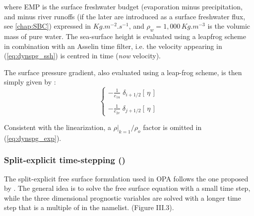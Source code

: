 \documentclass[../tex_main/NEMO_manual]{subfiles}
\begin{document}
where EMP is the surface freshwater budget (evaporation minus precipitation, and minus river runoffs (if the later are introduced as a surface freshwater flux, see \autoref{chap:SBC}) expressed in $Kg.m^{-2}.s^{-1}$, and $\rho _w =1,000\,Kg.m^{-3}$ is the volumic mass of pure water. The sea-surface height is evaluated using a leapfrog scheme in combination with an Asselin time filter, i.e. the velocity appearing in (\autoref{eq:dynspg_ssh}) is centred in time (\textit{now} velocity). 

The surface pressure gradient, also evaluated using a leap-frog scheme, is then simply given by :
\begin{equation} \label{eq:dynspg_exp}
\left\{ \begin{aligned}
 - \frac{1}    						{e_{1u}} \;	\delta _{i+1/2} \left[  \,\eta\,  \right] 	\\
 \\
 - \frac{1}    						{e_{2v}} \;	\delta _{j+1/2} \left[  \,\eta\,  \right]  
\end{aligned} \right.
\end{equation} 

Consistent with the linearization, a $\left. \rho \right|_{k=1} / \rho _o$ factor is omitted in (\autoref{eq:dynspg_exp}). 

\subsubsection{Split-explicit time-stepping (\protect{})}
\label{subsec:DYN_spg_ts}
The split-explicit free surface formulation used in OPA follows the one proposed by \citet{Griffies2004}. The general idea is to solve the free surface equation with a small time step, while the three dimensional prognostic variables are solved with a longer time step that is a multiple of 
in the   namelist. 
(Figure III.3). 
\end{document}
